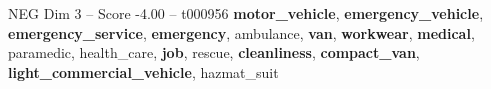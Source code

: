 \begin{textsample}{NEG Dim 3 – Score -4.00 – t000956}  \label{ex:f3_neg_036}
\textbf{motor\_vehicle}, \textbf{emergency\_vehicle}, \textbf{emergency\_service}, \textbf{emergency}, ambulance, \textbf{van}, \textbf{workwear}, \textbf{medical}, paramedic, health\_care, \textbf{job}, rescue, \textbf{cleanliness}, \textbf{compact\_van}, \textbf{light\_commercial\_vehicle}, hazmat\_suit

\end{textsample}
